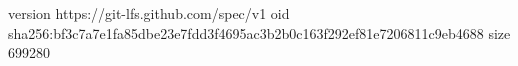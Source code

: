 version https://git-lfs.github.com/spec/v1
oid sha256:bf3c7a7e1fa85dbe23e7fdd3f4695ac3b2b0c163f292ef81e7206811c9eb4688
size 699280
